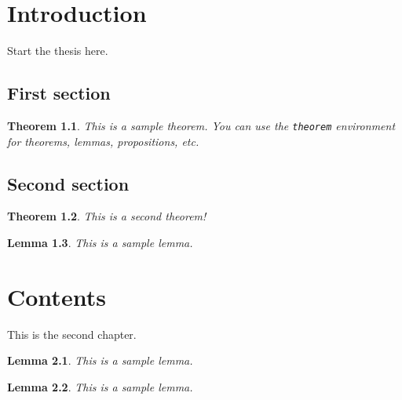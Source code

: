 \documentclass[english]{uw-thesis}
\author{Your Full Name}
\date{June 2026}
\newtheorem{theorem}{Theorem}[chapter]
\newtheorem{lemma}[theorem]{Lemma}
\begin{document}
\makefrontmatter

\chapter{Introduction}
Start the thesis here.

\section{First section}

\begin{theorem}
This is a sample theorem. You can use the \texttt{theorem} environment for theorems, lemmas, propositions, etc.
\end{theorem}

\cite{tarski_decision}

\section{Second section}

\begin{theorem}
This is a second theorem!
\end{theorem}

\begin{lemma}
This is a sample lemma.
\end{lemma}

\chapter{Contents}

This is the second chapter.

\begin{lemma}
This is a sample lemma.
\end{lemma}

\begin{lemma}
This is a sample lemma.
\end{lemma}



\end{document}
